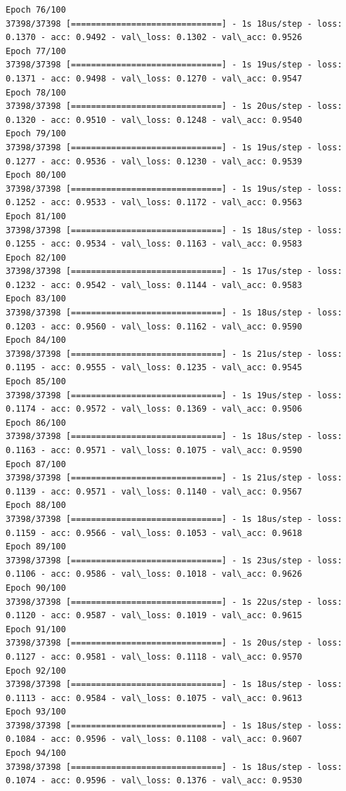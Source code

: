 \documentclass[11pt]{article}
\begin{document}
\begin{Verbatim}[commandchars=\\\{\}]
Epoch 76/100
37398/37398 [==============================] - 1s 18us/step - loss: 0.1370 - acc: 0.9492 - val\_loss: 0.1302 - val\_acc: 0.9526
Epoch 77/100
37398/37398 [==============================] - 1s 19us/step - loss: 0.1371 - acc: 0.9498 - val\_loss: 0.1270 - val\_acc: 0.9547
Epoch 78/100
37398/37398 [==============================] - 1s 20us/step - loss: 0.1320 - acc: 0.9510 - val\_loss: 0.1248 - val\_acc: 0.9540
Epoch 79/100
37398/37398 [==============================] - 1s 19us/step - loss: 0.1277 - acc: 0.9536 - val\_loss: 0.1230 - val\_acc: 0.9539
Epoch 80/100
37398/37398 [==============================] - 1s 19us/step - loss: 0.1252 - acc: 0.9533 - val\_loss: 0.1172 - val\_acc: 0.9563
Epoch 81/100
37398/37398 [==============================] - 1s 18us/step - loss: 0.1255 - acc: 0.9534 - val\_loss: 0.1163 - val\_acc: 0.9583
Epoch 82/100
37398/37398 [==============================] - 1s 17us/step - loss: 0.1232 - acc: 0.9542 - val\_loss: 0.1144 - val\_acc: 0.9583
Epoch 83/100
37398/37398 [==============================] - 1s 18us/step - loss: 0.1203 - acc: 0.9560 - val\_loss: 0.1162 - val\_acc: 0.9590
Epoch 84/100
37398/37398 [==============================] - 1s 21us/step - loss: 0.1195 - acc: 0.9555 - val\_loss: 0.1235 - val\_acc: 0.9545
Epoch 85/100
37398/37398 [==============================] - 1s 19us/step - loss: 0.1174 - acc: 0.9572 - val\_loss: 0.1369 - val\_acc: 0.9506
Epoch 86/100
37398/37398 [==============================] - 1s 18us/step - loss: 0.1163 - acc: 0.9571 - val\_loss: 0.1075 - val\_acc: 0.9590
Epoch 87/100
37398/37398 [==============================] - 1s 21us/step - loss: 0.1139 - acc: 0.9571 - val\_loss: 0.1140 - val\_acc: 0.9567
Epoch 88/100
37398/37398 [==============================] - 1s 18us/step - loss: 0.1159 - acc: 0.9566 - val\_loss: 0.1053 - val\_acc: 0.9618
Epoch 89/100
37398/37398 [==============================] - 1s 23us/step - loss: 0.1106 - acc: 0.9586 - val\_loss: 0.1018 - val\_acc: 0.9626
Epoch 90/100
37398/37398 [==============================] - 1s 22us/step - loss: 0.1120 - acc: 0.9587 - val\_loss: 0.1019 - val\_acc: 0.9615
Epoch 91/100
37398/37398 [==============================] - 1s 20us/step - loss: 0.1127 - acc: 0.9581 - val\_loss: 0.1118 - val\_acc: 0.9570
Epoch 92/100
37398/37398 [==============================] - 1s 18us/step - loss: 0.1113 - acc: 0.9584 - val\_loss: 0.1075 - val\_acc: 0.9613
Epoch 93/100
37398/37398 [==============================] - 1s 18us/step - loss: 0.1084 - acc: 0.9596 - val\_loss: 0.1108 - val\_acc: 0.9607
Epoch 94/100
37398/37398 [==============================] - 1s 18us/step - loss: 0.1074 - acc: 0.9596 - val\_loss: 0.1376 - val\_acc: 0.9530

\end{Verbatim}
\end{document}
